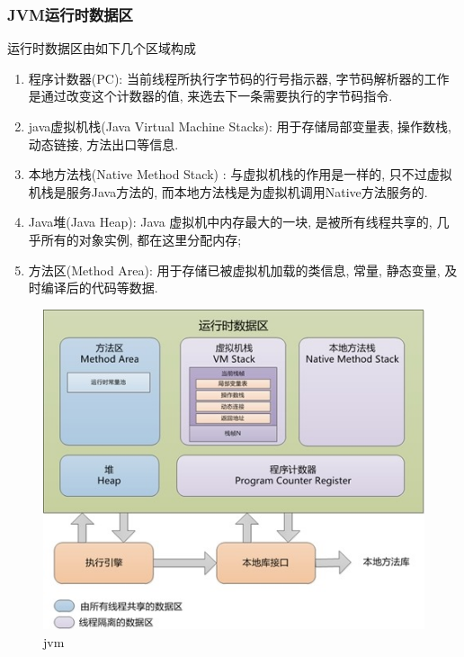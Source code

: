 \subsubsection{JVM运行时数据区}
运行时数据区由如下几个区域构成
\begin{enumerate}
	\item 程序计数器(PC): 当前线程所执行字节码的行号指示器, 字节码解析器的工作是通过改变这个计数器的值, 来选去下一条需要执行的字节码指令.
	\item java虚拟机栈(Java Virtual Machine Stacks): 用于存储局部变量表, 操作数栈, 动态链接, 方法出口等信息.
	\item 本地方法栈(Native Method Stack) : 与虚拟机栈的作用是一样的, 只不过虚拟机栈是服务Java方法的, 而本地方法栈是为虚拟机调用Native方法服务的.
	\item Java堆(Java Heap): Java 虚拟机中内存最大的一块, 是被所有线程共享的, 几乎所有的对象实例, 都在这里分配内存;
	\item 方法区(Method Area): 用于存储已被虚拟机加载的类信息, 常量, 静态变量, 及时编译后的代码等数据.
\end{enumerate}
\begin{figure}
	\centering
	\includegraphics[width=0.7\linewidth]{figures/jvm.jpg}
	\caption{jvm}
	\label{fig:jvm}
\end{figure}
